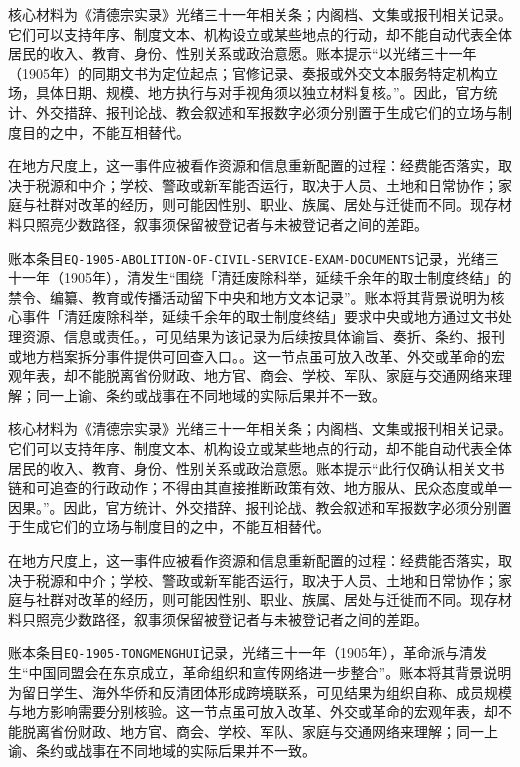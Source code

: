 核心材料为《清德宗实录》光绪三十一年相关条；内阁档、文集或报刊相关记录。它们可以支持年序、制度文本、机构设立或某些地点的行动，却不能自动代表全体居民的收入、教育、身份、性别关系或政治意愿。账本提示“以光绪三十一年（1905年）的同期文书为定位起点；官修记录、奏报或外交文本服务特定机构立场，具体日期、规模、地方执行与对手视角须以独立材料复核。”。因此，官方统计、外交措辞、报刊论战、教会叙述和军报数字必须分别置于生成它们的立场与制度目的之中，不能互相替代。

在地方尺度上，这一事件应被看作资源和信息重新配置的过程：经费能否落实，取决于税源和中介；学校、警政或新军能否运行，取决于人员、土地和日常协作；家庭与社群对改革的经历，则可能因性别、职业、族属、居处与迁徙而不同。现存材料只照亮少数路径，叙事须保留被登记者与未被登记者之间的差距。

账本条目\texttt{EQ-1905-ABOLITION-OF-CIVIL-SERVICE-EXAM-DOCUMENTS}记录，光绪三十一年（1905年），清发生“围绕「清廷废除科举，延续千余年的取士制度终结」的禁令、编纂、教育或传播活动留下中央和地方文本记录”。账本将其背景说明为核心事件「清廷废除科举，延续千余年的取士制度终结」要求中央或地方通过文书处理资源、信息或责任。，可见结果为该记录为后续按具体谕旨、奏折、条约、报刊或地方档案拆分事件提供可回查入口。。这一节点虽可放入改革、外交或革命的宏观年表，却不能脱离省份财政、地方官、商会、学校、军队、家庭与交通网络来理解；同一上谕、条约或战事在不同地域的实际后果并不一致。

核心材料为《清德宗实录》光绪三十一年相关条；内阁档、文集或报刊相关记录。它们可以支持年序、制度文本、机构设立或某些地点的行动，却不能自动代表全体居民的收入、教育、身份、性别关系或政治意愿。账本提示“此行仅确认相关文书链和可追查的行政动作；不得由其直接推断政策有效、地方服从、民众态度或单一因果。”。因此，官方统计、外交措辞、报刊论战、教会叙述和军报数字必须分别置于生成它们的立场与制度目的之中，不能互相替代。

在地方尺度上，这一事件应被看作资源和信息重新配置的过程：经费能否落实，取决于税源和中介；学校、警政或新军能否运行，取决于人员、土地和日常协作；家庭与社群对改革的经历，则可能因性别、职业、族属、居处与迁徙而不同。现存材料只照亮少数路径，叙事须保留被登记者与未被登记者之间的差距。

账本条目\texttt{EQ-1905-TONGMENGHUI}记录，光绪三十一年（1905年），革命派与清发生“中国同盟会在东京成立，革命组织和宣传网络进一步整合”。账本将其背景说明为留日学生、海外华侨和反清团体形成跨境联系，可见结果为组织自称、成员规模与地方影响需要分别核验。这一节点虽可放入改革、外交或革命的宏观年表，却不能脱离省份财政、地方官、商会、学校、军队、家庭与交通网络来理解；同一上谕、条约或战事在不同地域的实际后果并不一致。

